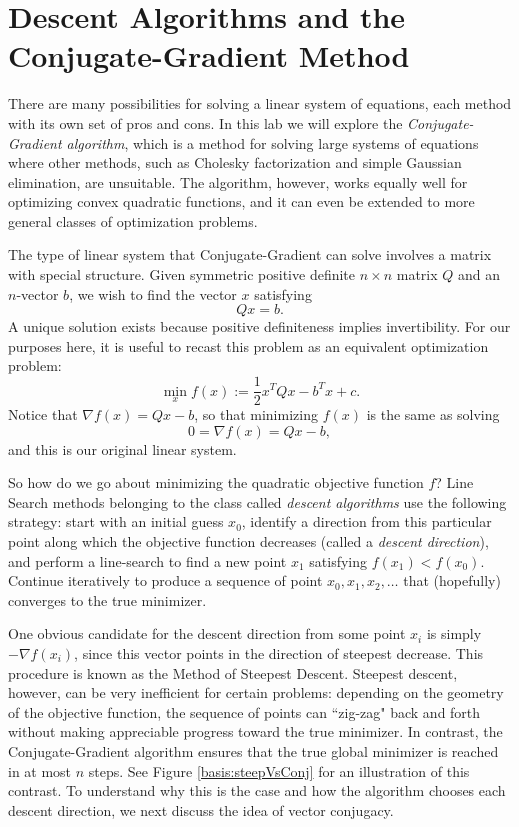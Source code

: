 
\section*{Descent Algorithms and the Conjugate-Gradient Method}
There are many possibilities for solving a linear system of equations, each method with its own set of pros and cons. In this lab we 
will explore the \emph{Conjugate-Gradient algorithm}, which is a method for solving large systems of equations where other methods, 
such as Cholesky factorization and simple Gaussian elimination, are unsuitable. The algorithm, however, works equally well for 
optimizing convex quadratic functions, and it can even be extended to more general classes of optimization problems.

The type of linear system that Conjugate-Gradient can solve involves a matrix with special structure.
Given symmetric positive definite $n\times n$ matrix $Q$ and an $n$-vector $b$, we wish to find the vector $x$ satisfying
$$
Qx = b.
$$
A unique solution exists because positive definiteness implies invertibility.
For our purposes here, it is useful to recast this problem as an equivalent optimization problem:
$$
\min_{x} f(x) := \frac{1}{2}x^TQx - b^Tx + c.
$$
Notice that $\nabla f(x) = Qx - b$, so that minimizing $f(x)$ is the same as solving 
$$
0 = \nabla f(x) = Qx - b,
$$ 
and this is our original linear system.

So how do we go about minimizing the quadratic objective function $f$? Line Search methods belonging to the class called 
\emph{descent algorithms} use the following strategy: start with an initial guess $x_0$, identify a direction from 
this particular point along which the objective function decreases (called a \emph{descent direction}), and perform a line-search to 
find a new point $x_1$ satisfying $f(x_1) < f(x_0)$. Continue iteratively to produce a sequence of point $x_0, x_1, x_2, \ldots$ 
that (hopefully) converges to the true minimizer. 

One obvious candidate for the descent direction from some point $x_i$ is simply 
$-\nabla f(x_i)$, since this vector points in the direction of steepest decrease. This procedure is known as the Method of Steepest 
Descent. Steepest descent, however, can be very inefficient for certain problems: depending on the geometry 
of the objective function, the sequence of points can ``zig-zag" back and forth without making appreciable progress toward the true 
minimizer. In contrast, the Conjugate-Gradient algorithm ensures that the true global minimizer is reached in at most $n$ steps. See 
Figure \ref{basis:steepVsConj} for an illustration of this contrast.
To understand why this is the case and how the algorithm chooses each descent direction, we next discuss the idea of vector conjugacy.

